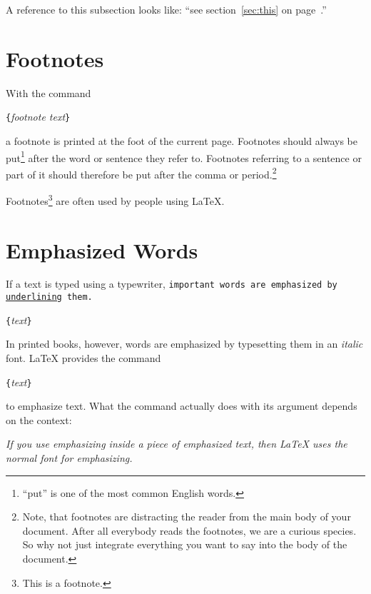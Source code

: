 \begin{example}
A reference to this subsection
\label{sec:this} looks like:
``see section~\ref{sec:this} on 
page~\pageref{sec:this}.''
\end{example}
 
\section{Footnotes}
With the command
\begin{lscommand}
\verb|{|\emph{footnote text}\verb|}|
\end{lscommand}
\noindent a footnote is printed at the foot of the current page.  Footnotes
should always be put\footnote{``put'' is one of the most common
  English words.} after the word or sentence they refer to. Footnotes
referring to a sentence or part of it should therefore be put after
the comma or period.\footnote{Note, that footnotes are
  distracting the reader from the main body of your document. After all
  everybody reads the footnotes, we are a curious species. So why not
  just integrate everything you want to say into the body of the
  document.\footnotemark}

\begin{example}
Footnotes\footnote{This is 
  a footnote.} are often used 
by people using \LaTeX.
\end{example}
 
\section{Emphasized Words}

If a text is typed using a typewriter, \texttt{important words are
  emphasized by \underline{underlining} them.}
\begin{lscommand}
\verb|{|\emph{text}\verb|}|
\end{lscommand}
In printed books,
however, words are emphasized by typesetting them in an \emph{italic}
font.  \LaTeX{} provides the command
\begin{lscommand}
\verb|{|\emph{text}\verb|}|
\end{lscommand}
\noindent to emphasize text.  What the command actually does with 
its argument depends on the context:

\begin{example}
\emph{If you use 
  emphasizing inside a piece
  of emphasized text, then 
  \LaTeX{} uses the
  \emph{normal} font for 
  emphasizing.}
\end{example}

